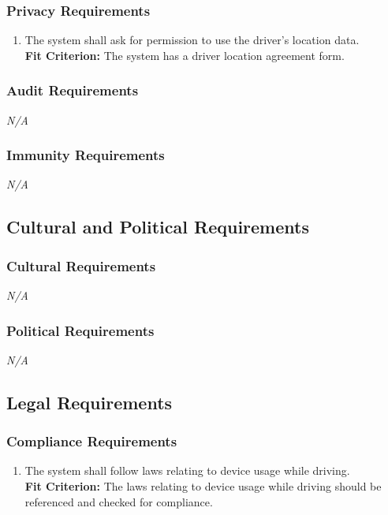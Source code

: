 \documentclass[12pt,letterpaper]{article}
\begin{document}
\subsubsection{Privacy Requirements}
\begin{enumerate}[resume*] 
    \item The system shall ask for permission to use the driver's location
    data.\\
    \textbf{Fit Criterion:} The system has a driver location agreement form.
\end{enumerate}

\subsubsection{Audit Requirements}
\noindent \emph{N/A}

\subsubsection{Immunity Requirements}
\noindent \emph{N/A}

\subsection{Cultural and Political Requirements}
\subsubsection{Cultural Requirements}
\noindent \emph{N/A}

\subsubsection{Political Requirements}
\noindent \emph{N/A}

\subsection{Legal Requirements}
\subsubsection{Compliance Requirements}
\begin{enumerate}[{LR}1.] 
    \item The system shall follow laws relating to device usage while driving.\\
    \textbf{Fit Criterion:} The laws relating to device usage while driving
    should be referenced and checked for compliance.
\end{enumerate}
\end{document}
